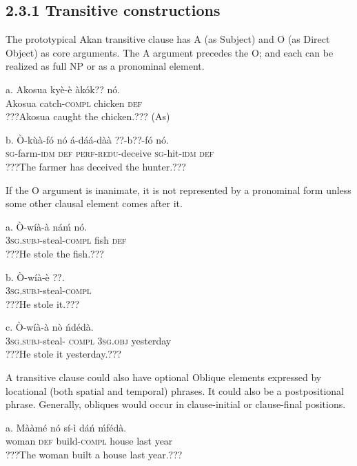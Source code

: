 \documentclass[output=paper]{langsci/langscibook}
\begin{document}
\subsection{2.3.1  Transitive constructions}

The prototypical Akan transitive clause has A (as Subject) and O (as Direct Object) as core arguments. The A argument precedes the O; and each can be realized as full NP or as a pronominal element.


\ea
\gll a.  Akosua    kyè-è    àkók??    nó.\\
       Akosua  catch-\textsc{compl}  chicken  \textsc{def}\\
\glt   ???Akosua caught the chicken.??? (As)
\z

\ea
\gll  b.  \`{O}-k\`{u}à-fó    nó  á-dáá-dàà    ??{}-b??-fó    nó.\\
       \textsc{sg}{}-farm-\textsc{idm}    \textsc{def}  \textsc{perf-redu}{}-deceive  \textsc{sg}{}-hit-\textsc{idm}  \textsc{def}\\
\glt   ???The farmer has deceived the hunter.???
\z

If the O argument is inanimate, it is not represented by a pronominal form unless some other clausal element comes after it.

\ea
\gll a.  \`{O}-wíà-à    náḿ  nó.\\
       \textsc{3sg.subj}{}-steal-\textsc{compl}  fish  \textsc{def}\\
\glt   ???He stole the fish.???
\z

\ea
\gll  b.  \`{O}-wíà-è      ??.\\
       \textsc{3sg.subj}{}-steal-\textsc{compl}\\
\glt   ???He stole it.???
\z

\ea
\gll  c.  \`{O}-wíà-à      nò    ńdédà.\\
       \textsc{3sg.subj}{}-steal-\textsc{ compl}  \textsc{3sg.obj}  yesterday\\
\glt   ???He stole it yesterday.???
\z

A transitive clause could also have optional Oblique elements expressed by locational (both spatial and temporal) phrases. It could also be a postpositional phrase. Generally, obliques would occur in clause-initial or clause-final positions. 

\ea
\gll a.  Mààmé    nó  sí-ì    dáń  ḿfédà.\\
       woman    \textsc{def}  build-\textsc{compl}  house  last year\\
\glt   ???The woman built a house last year.???
\z
\end{document}
